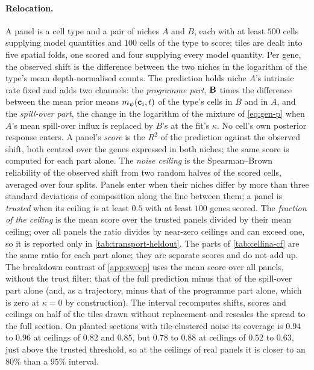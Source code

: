 \paragraph{Relocation.} A panel is a cell type and a pair of niches $A$ and $B$, each with at least $500$ cells supplying model quantities and $100$ cells of the type to score; tiles are dealt into five spatial folds, one scored and four supplying every model quantity. Per gene, the observed shift is the difference between the two niches in the logarithm of the type's mean depth-normalised counts. The prediction holds niche $A$'s intrinsic rate fixed and adds two channels: the \emph{programme part}, $\mathbf{B}$ times the difference between the mean prior means $m_{\psi}(\mathbf{c}_i, t)$ of the type's cells in $B$ and in $A$, and the \emph{spill-over part}, the change in the logarithm of the mixture of \cref{eq:gen-p} when $A$'s mean spill-over influx is replaced by $B$'s at the fit's $\kappa$. No cell's own posterior response enters. A panel's \emph{score} is the $R^2$ of the prediction against the observed shift, both centred over the genes expressed in both niches; the same score is computed for each part alone. The \emph{noise ceiling} is the Spearman--Brown reliability of the observed shift from two random halves of the scored cells, averaged over four splits. Panels enter when their niches differ by more than three standard deviations of composition along the line between them; a panel is \emph{trusted} when its ceiling is at least $0.5$ with at least $100$ genes scored. The \emph{fraction of the ceiling} is the mean score over the trusted panels divided by their mean ceiling; over all panels the ratio divides by near-zero ceilings and can exceed one, so it is reported only in \cref{tab:transport-heldout}. The parts of \cref{tab:cellina-cf} are the same ratio for each part alone; they are separate scores and do not add up. The breakdown contrast of \cref{app:sweep} uses the mean score over all panels, without the trust filter: that of the full prediction minus that of the spill-over part alone (and, as a trajectory, minus that of the programme part alone, which is zero at $\kappa = 0$ by construction).
The interval recomputes shifts, scores and ceilings on half of the tiles drawn without replacement and rescales the spread to the full section. On planted sections with tile-clustered noise its coverage is $0.94$ to $0.96$ at ceilings of $0.82$ and $0.85$, but $0.78$ to $0.88$ at ceilings of $0.52$ to $0.63$, just above the trusted threshold, so at the ceilings of real panels it is closer to an $80\%$ than a $95\%$ interval.
